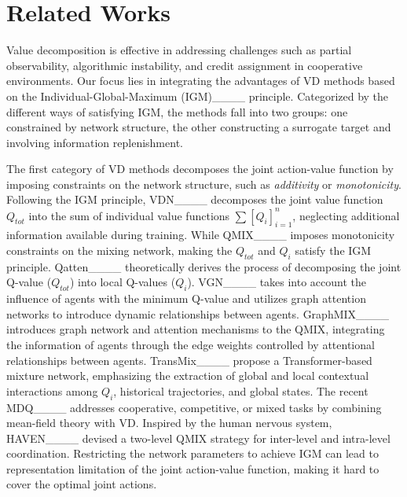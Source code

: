 \section{Related Works}
\label{}
Value decomposition is effective in addressing challenges such as partial observability, algorithmic instability, and credit assignment in cooperative environments.
Our focus lies in integrating the advantages of VD methods based on the Individual-Global-Maximum (IGM)____ principle. Categorized by the different ways of satisfying IGM, the methods fall into two groups: one constrained by network structure, the other constructing a surrogate target and involving information replenishment.

The first category of VD methods decomposes the joint action-value function by imposing constraints on the network structure, such as \textit{additivity} or \textit{monotonicity}. Following the IGM principle, VDN____ decomposes the joint value function $Q_{tot}$ into the sum of individual value functions $\sum [Q_{i}]_{i=1}^{n}$, neglecting additional information available during training. While QMIX____ imposes monotonicity constraints on the mixing network, making the $Q_{tot}$ and $Q_{i}$ satisfy the IGM principle.
Qatten____ theoretically derives the process of decomposing the joint Q-value ($Q_{tot}$) into local Q-values ($Q_{i}$).
VGN____ takes into account the influence of agents with the minimum Q-value and utilizes graph attention networks to introduce dynamic relationships between agents.
GraphMIX____ introduces graph network and attention mechanisms to the QMIX, integrating the information of agents through the edge weights controlled by attentional relationships between agents.
TransMix____ propose a Transformer-based mixture network, emphasizing the extraction of global and local contextual interactions among $Q_i$, historical trajectories, and global states.
The recent MDQ____ addresses cooperative, competitive, or mixed tasks by combining mean-field theory with VD.
Inspired by the human nervous system, HAVEN____ devised a two-level QMIX strategy for inter-level and intra-level coordination.
Restricting the network parameters to achieve IGM can lead to representation limitation of the joint action-value function, making it hard to cover the optimal joint actions.

